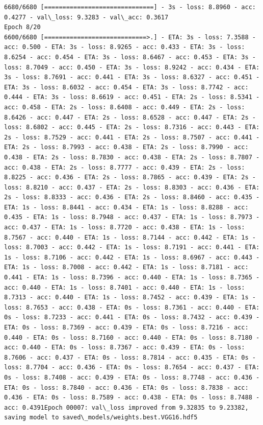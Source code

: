 \documentclass[11pt]{article}
\begin{document}
\begin{Verbatim}[commandchars=\\\{\}]
6680/6680 [==============================] - 3s - loss: 8.8960 - acc: 0.4277 - val\_loss: 9.3283 - val\_acc: 0.3617
Epoch 8/20
6600/6680 [============================>.] - ETA: 3s - loss: 7.3588 - acc: 0.500 - ETA: 3s - loss: 8.9265 - acc: 0.433 - ETA: 3s - loss: 8.6254 - acc: 0.454 - ETA: 3s - loss: 8.6467 - acc: 0.453 - ETA: 3s - loss: 8.7049 - acc: 0.450 - ETA: 3s - loss: 8.9242 - acc: 0.434 - ETA: 3s - loss: 8.7691 - acc: 0.441 - ETA: 3s - loss: 8.6327 - acc: 0.451 - ETA: 3s - loss: 8.6032 - acc: 0.454 - ETA: 3s - loss: 8.7742 - acc: 0.444 - ETA: 3s - loss: 8.6619 - acc: 0.451 - ETA: 2s - loss: 8.5341 - acc: 0.458 - ETA: 2s - loss: 8.6408 - acc: 0.449 - ETA: 2s - loss: 8.6426 - acc: 0.447 - ETA: 2s - loss: 8.6528 - acc: 0.447 - ETA: 2s - loss: 8.6802 - acc: 0.445 - ETA: 2s - loss: 8.7316 - acc: 0.443 - ETA: 2s - loss: 8.7529 - acc: 0.441 - ETA: 2s - loss: 8.7507 - acc: 0.441 - ETA: 2s - loss: 8.7993 - acc: 0.438 - ETA: 2s - loss: 8.7990 - acc: 0.438 - ETA: 2s - loss: 8.7830 - acc: 0.438 - ETA: 2s - loss: 8.7807 - acc: 0.438 - ETA: 2s - loss: 8.7777 - acc: 0.439 - ETA: 2s - loss: 8.8225 - acc: 0.436 - ETA: 2s - loss: 8.7865 - acc: 0.439 - ETA: 2s - loss: 8.8210 - acc: 0.437 - ETA: 2s - loss: 8.8303 - acc: 0.436 - ETA: 2s - loss: 8.8333 - acc: 0.436 - ETA: 2s - loss: 8.8460 - acc: 0.435 - ETA: 1s - loss: 8.8441 - acc: 0.434 - ETA: 1s - loss: 8.8288 - acc: 0.435 - ETA: 1s - loss: 8.7948 - acc: 0.437 - ETA: 1s - loss: 8.7973 - acc: 0.437 - ETA: 1s - loss: 8.7720 - acc: 0.438 - ETA: 1s - loss: 8.7567 - acc: 0.440 - ETA: 1s - loss: 8.7144 - acc: 0.442 - ETA: 1s - loss: 8.7003 - acc: 0.442 - ETA: 1s - loss: 8.7191 - acc: 0.441 - ETA: 1s - loss: 8.7106 - acc: 0.442 - ETA: 1s - loss: 8.6967 - acc: 0.443 - ETA: 1s - loss: 8.7008 - acc: 0.442 - ETA: 1s - loss: 8.7181 - acc: 0.441 - ETA: 1s - loss: 8.7396 - acc: 0.440 - ETA: 1s - loss: 8.7365 - acc: 0.440 - ETA: 1s - loss: 8.7401 - acc: 0.440 - ETA: 1s - loss: 8.7313 - acc: 0.440 - ETA: 1s - loss: 8.7452 - acc: 0.439 - ETA: 1s - loss: 8.7653 - acc: 0.438 - ETA: 0s - loss: 8.7361 - acc: 0.440 - ETA: 0s - loss: 8.7233 - acc: 0.441 - ETA: 0s - loss: 8.7432 - acc: 0.439 - ETA: 0s - loss: 8.7369 - acc: 0.439 - ETA: 0s - loss: 8.7216 - acc: 0.440 - ETA: 0s - loss: 8.7160 - acc: 0.440 - ETA: 0s - loss: 8.7180 - acc: 0.440 - ETA: 0s - loss: 8.7367 - acc: 0.439 - ETA: 0s - loss: 8.7606 - acc: 0.437 - ETA: 0s - loss: 8.7814 - acc: 0.435 - ETA: 0s - loss: 8.7704 - acc: 0.436 - ETA: 0s - loss: 8.7654 - acc: 0.437 - ETA: 0s - loss: 8.7408 - acc: 0.439 - ETA: 0s - loss: 8.7748 - acc: 0.436 - ETA: 0s - loss: 8.7840 - acc: 0.436 - ETA: 0s - loss: 8.7838 - acc: 0.436 - ETA: 0s - loss: 8.7589 - acc: 0.438 - ETA: 0s - loss: 8.7488 - acc: 0.4391Epoch 00007: val\_loss improved from 9.32835 to 9.23382, saving model to saved\_models/weights.best.VGG16.hdf5

\end{Verbatim}
\end{document}
